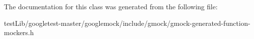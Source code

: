 The documentation for this class was generated from the following file\+:\begin{DoxyCompactItemize}
\item 
test\+Lib/googletest-\/master/googlemock/include/gmock/gmock-\/generated-\/function-\/mockers.\+h\end{DoxyCompactItemize}
